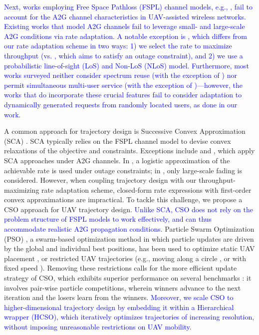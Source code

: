 \documentclass[12pt, draftcls, onecolumn]{IEEEtran}
\theoremstyle{plain}
\theoremstyle{definition}
\theoremstyle{remark}
\newcommand\hlt[1]{\textcolor{blue}{#1}}
\begin{document}
\hlt{Next, works employing Free Space Pathloss (FSPL) channel models, e.g., \cite{SCA, PAoI, MEC-CVX, MEC-DDPG}, fail to account for the A2G channel characteristics in UAV-assisted wireless networks. 
Existing works that model A2G channels fail to leverage small- and large-scale A2G conditions via rate adaptation. A notable exception is \cite{Rician}, which differs from our rate adaptation scheme in two ways: 1) we select the rate to maximize throughput (vs. \cite{Rician}, which aims to satisfy an outage constraint), and 2) we use a probabilistic line-of-sight (LoS) and Non-LoS (NLoS) model. Furthermore, most works surveyed neither consider spectrum reuse (with the exception of \cite{CSCA-ADMM}) nor permit simultaneous multi-user service (with the exception of \cite{CSCA-ADMM, DDQN, MEC-DDPG})---however, the works that do incorporate these crucial features \cite{CSCA-ADMM, DDQN, MEC-DDPG} fail to consider adaptation to dynamically generated requests from randomly located users, as done in our work.}

A common approach for trajectory design is Successive Convex Approximation (SCA) \cite{SCA, Rician}. SCA typically relies on the FSPL channel model to devise convex relaxations of the objective and constraints. Exceptions include \cite{Rician} and \cite{CSCA-ADMM}, which apply SCA approaches under A2G channels. In \cite{Rician}, a logistic approximation of the achievable rate is used under outage constraints; in \cite{CSCA-ADMM}, only large-scale fading is considered. However, when coupling trajectory design with our throughput-maximizing rate adaptation scheme, closed-form rate expressions with first-order convex approximations are impractical. To tackle this challenge, we propose a CSO \cite{CSO} approach for UAV trajectory design. \hlt{Unlike SCA, CSO does not rely on the problem structure of FSPL models to work effectively, and can thus accommodate realistic A2G propagation conditions.} Particle Swarm Optimization (PSO) \cite{PSO}, a swarm-based optimization method in which particle updates are driven by the global and individual best positions, has been used to optimize static UAV placement \cite{Efficient3DPlacementPSO, 3DDeploymentPSO}, or restricted UAV trajectories (e.g., moving along a circle \cite{PSOPathStructure}, or with fixed speed \cite{PAoI}). Removing these restrictions calls for the more efficient update strategy of CSO, which exhibits superior performance on several benchmarks \cite{CSO}: it involves pair-wise particle competitions, wherein winners advance to the next iteration and the losers learn from the winners. \hlt{Moreover, we scale CSO to higher-dimensional trajectory design by embedding it within a Hierarchical wrapper (HCSO), which iteratively optimizes trajectories of increasing resolution, without imposing unreasonable restrictions on UAV mobility.}
\end{document}
